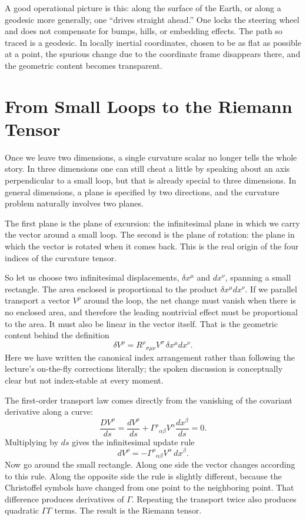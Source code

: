 A good operational picture is this: along the surface of the Earth, or along a geodesic more generally, one ``drives straight ahead.'' One locks the steering wheel and does not compensate for bumps, hills, or embedding effects. The path so traced is a geodesic. In locally inertial coordinates, chosen to be as flat as possible at a point, the spurious change due to the coordinate frame disappears there, and the geometric content becomes transparent.

\section{From Small Loops to the Riemann Tensor}

Once we leave two dimensions, a single curvature scalar no longer tells the whole story. In three dimensions one can still cheat a little by speaking about an axis perpendicular to a small loop, but that is already special to three dimensions. In general dimensions, a plane is specified by two directions, and the curvature problem naturally involves two planes.

The first plane is the plane of excursion: the infinitesimal plane in which we carry the vector around a small loop. The second is the plane of rotation: the plane in which the vector is rotated when it comes back. This is the real origin of the four indices of the curvature tensor.

So let us choose two infinitesimal displacements, \(\delta x^\mu\) and \(dx^\nu\), spanning a small rectangle. The area enclosed is proportional to the product \(\delta x^\mu dx^\nu\). If we parallel transport a vector \(V^\rho\) around the loop, the net change must vanish when there is no enclosed area, and therefore the leading nontrivial effect must be proportional to the area. It must also be linear in the vector itself. That is the geometric content behind the definition
\begin{equation}
\delta V^\rho = R^\rho{}_{\sigma\mu\nu}V^\sigma\,\delta x^\mu dx^\nu.
\end{equation}
Here we have written the canonical index arrangement rather than following the lecture's on-the-fly corrections literally; the spoken discussion is conceptually clear but not index-stable at every moment.

The first-order transport law comes directly from the vanishing of the covariant derivative along a curve:
\begin{equation}
\frac{D V^\rho}{ds}
=
\frac{dV^\rho}{ds}
+
\Gamma^\rho{}_{\alpha\beta}V^\alpha \frac{dx^\beta}{ds}
=
0.
\end{equation}
Multiplying by \(ds\) gives the infinitesimal update rule
\begin{equation}
dV^\rho=-\Gamma^\rho{}_{\alpha\beta}V^\alpha\,dx^\beta.
\end{equation}
Now go around the small rectangle. Along one side the vector changes according to this rule. Along the opposite side the rule is slightly different, because the Christoffel symbols have changed from one point to the neighboring point. That difference produces derivatives of \(\Gamma\). Repeating the transport twice also produces quadratic \(\Gamma\Gamma\) terms. The result is the Riemann tensor.

